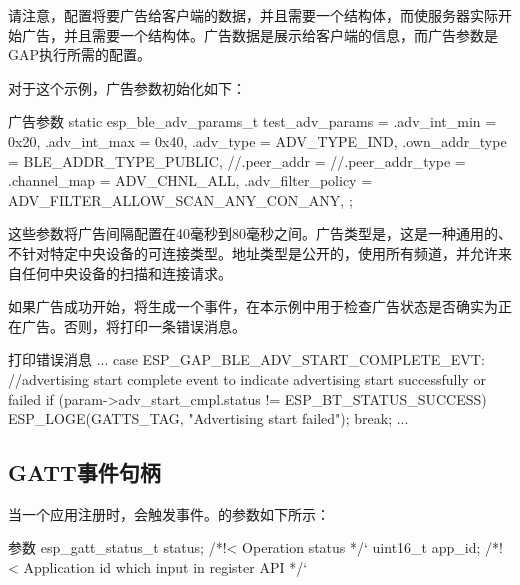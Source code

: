 \documentclass[lang=cn,newtx,10pt,scheme=chinese]{elegantbook}
\begin{document}
请注意，配置将要广告给客户端的数据，并且需要一个结构体，而使服务器实际开始广告，并且需要一个结构体。广告数据是展示给客户端的信息，而广告参数是GAP执行所需的配置。

对于这个示例，广告参数初始化如下：

\begin{mycode}{广告参数}
static esp_ble_adv_params_t test_adv_params = {
    .adv_int_min        = 0x20,
    .adv_int_max        = 0x40,
    .adv_type           = ADV_TYPE_IND,
    .own_addr_type      = BLE_ADDR_TYPE_PUBLIC,
    //.peer_addr        =
    //.peer_addr_type   =
    .channel_map        = ADV_CHNL_ALL,
    .adv_filter_policy  = ADV_FILTER_ALLOW_SCAN_ANY_CON_ANY,
};
\end{mycode}

这些参数将广告间隔配置在40毫秒到80毫秒之间。广告类型是，这是一种通用的、不针对特定中央设备的可连接类型。地址类型是公开的，使用所有频道，并允许来自任何中央设备的扫描和连接请求。

如果广告成功开始，将生成一个事件，在本示例中用于检查广告状态是否确实为正在广告。否则，将打印一条错误消息。

\begin{mycode}{打印错误消息}
...
    case ESP_GAP_BLE_ADV_START_COMPLETE_EVT:
    //advertising start complete event to indicate advertising start successfully or failed
         if (param->adv_start_cmpl.status != ESP_BT_STATUS_SUCCESS) {
             ESP_LOGE(GATTS_TAG, "Advertising start failed\n");
         }
         break;
...
\end{mycode}

\subsection{GATT事件句柄}

当一个应用注册时，会触发事件。的参数如下所示：

\begin{mycode}{参数}
esp_gatt_status_t status;  /*!< Operation status */`
uint16_t app_id;           /*!< Application id which input in register API */`
\end{mycode}
\end{document}
